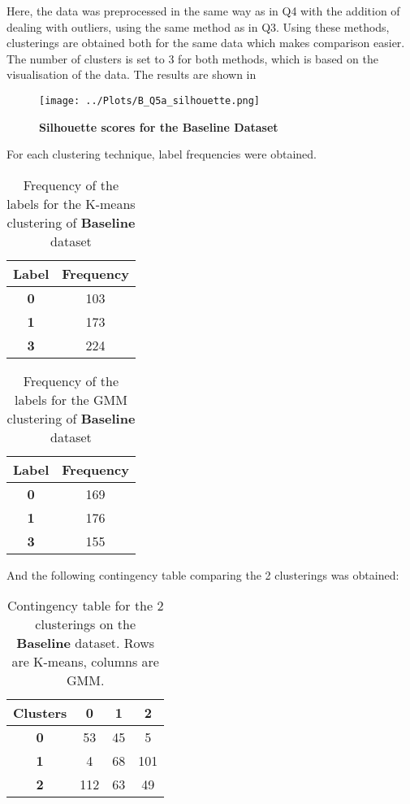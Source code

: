 \documentclass[12pt]{report} %
\begin{document}
Here, the data was preprocessed in the same way as in Q4 with the addition of dealing with outliers, using the same method as in Q3.
Using these methods, clusterings are obtained both for the same data which makes comparison easier. The number of clusters is set to 3 for both methods, which is based on the visualisation of the data. The results are shown in

\begin{figure}[htbp]
    \centering
    \texttt{[image: ../Plots/B\_Q5a\_silhouette.png]}
    \caption{\textbf{Silhouette scores for the Baseline Dataset}}
\end{figure}

For each clustering technique, label frequencies were obtained.

\begin{table}[h]
    \centering
    \begin{tabular}{ |c|c| }
        \hline
        \textbf{Label} & \textbf{Frequency} \\
        \hline
        \textbf{0} & 103 \\ 
        \hline
        \textbf{1} & 173 \\
        \hline
        \textbf{3} & 224 \\
        \hline
    \end{tabular}
    \caption{Frequency of the labels for the K-means clustering of \textbf{Baseline} dataset}
\end{table}

\begin{table}[h]
    \centering
    \begin{tabular}{ |c|c| }
        \hline
        \textbf{Label} & \textbf{Frequency} \\
        \hline
        \textbf{0} & 169 \\ 
        \hline
        \textbf{1} & 176 \\
        \hline
        \textbf{3} & 155 \\
        \hline
    \end{tabular}
    \caption{Frequency of the labels for the GMM clustering of \textbf{Baseline} dataset}
\end{table}

And the following contingency table comparing the 2 clusterings was obtained:

\begin{table}[h]
    \centering
    \begin{tabular}{ |c|c|c|c| }
        \hline
        \textbf{Clusters} & \textbf{0} & \textbf{1} & \textbf{2}\\ 
        \hline
        \textbf{0} & 53 & 45 & 5\\
        \hline
        \textbf{1} & 4 & 68 & 101\\
        \hline
        \textbf{2} & 112 & 63 & 49\\
        \hline
    \end{tabular}
    \caption{Contingency table for the 2 clusterings on the \textbf{Baseline} dataset. Rows are K-means, columns are GMM.}
\end{table}
\end{document}
